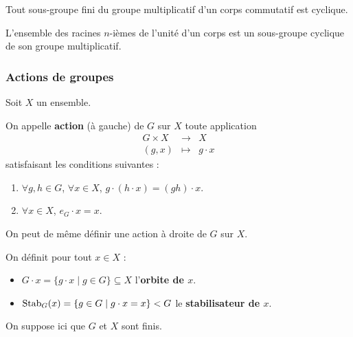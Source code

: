 
	\begin{theorem}
		Tout sous-groupe fini du groupe multiplicatif d'un corps commutatif est cyclique.
	\end{theorem}

	\begin{corollary}
		L'ensemble des racines $n$-ièmes de l'unité d'un corps est un sous-groupe cyclique de son groupe multiplicatif.
	\end{corollary}

	\subsubsection{Actions de groupes}


	Soit $X$ un ensemble.

	\begin{definition}
		On appelle \textbf{action} (à gauche) de $G$ sur $X$ toute application
		\[
		\begin{array}{ccc}
			G \times X &\rightarrow& X \\
			(g, x) &\mapsto& g \cdot x
		\end{array}
		\]
		satisfaisant les conditions suivantes :
		\begin{enumerate}[label=(\roman*)]
			\item $\forall g, h \in G$, $\forall x \in X$, $g \cdot (h \cdot x) = (gh) \cdot x$.
			\item $\forall x \in X$, $e_G \cdot x = x$.
		\end{enumerate}
	\end{definition}

	\begin{remark}
		On peut de même définir une action à droite de $G$ sur $X$.
	\end{remark}

	\begin{definition}
		On définit pour tout $x \in X$ :
		\begin{itemize}
			\item $G \cdot x = \{ g \cdot x \mid g \in G \} \subseteq X$ l'\textbf{orbite de $x$}.
			\item $\operatorname{Stab}_G(x) = \{ g \in G \mid g \cdot x = x \} < G$ le \textbf{stabilisateur de $x$}.
		\end{itemize}
	\end{definition}

	On suppose ici que $G$ et $X$ sont finis.

